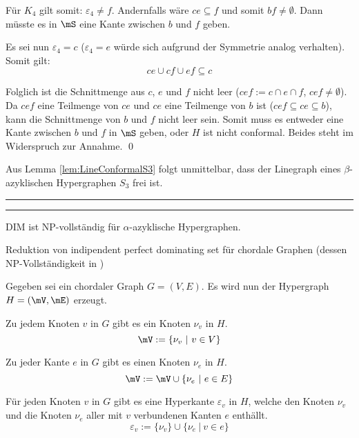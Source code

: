 \begin{Proof}
Für $K_4$ gilt somit: $\varepsilon_4\neq f$. Andernfalls wäre $ce \subseteq f$ und somit $bf\neq\emptyset$. Dann müsste es in $\mS$ eine Kante zwischen $b$ und $f$ geben. 

Es sei nun $\varepsilon_4=c$ ($\varepsilon_4=e$ würde sich aufgrund der Symmetrie analog verhalten). Somit gilt:
\[ce \cup cf \cup ef \subseteq c\]

Folglich ist die Schnittmenge aus $c$, $e$ und $f$ nicht leer ($cef:=c \cap e \cap f$, $cef \neq \emptyset$). Da $cef$ eine Teilmenge von $ce$ und $ce$ eine Teilmenge von $b$ ist ($cef \subseteq ce \subseteq b$), kann die Schnittmenge von $b$ und $f$ nicht leer sein.
Somit muss es entweder eine Kante zwischen $b$ und $f$ in $\mS$ geben, oder $H$ ist nicht conformal. Beides steht im Widerspruch zur Annahme.
\qed
\end{Proof}

Aus Lemma \ref{lem:LineConformalS3} folgt unmittelbar, dass der Linegraph eines $\beta$-azyklischen Hypergraphen $S_3$ frei ist.

\rule{\linewidth}{1pt}
\clearpage


\rule{\linewidth}{1pt}
\clearpage

\begin{Theorem}
	DIM ist NP-vollständig für $\alpha$-azyklische Hypergraphen.
\end{Theorem}
Reduktion von indipendent perfect dominating set für chordale Graphen (dessen NP-Vollständigkeit in \cite{ChainChin1996})

Gegeben sei ein chordaler Graph $G=(V,E)$. Es wird nun der Hypergraph $H=(\mV,\mE)$ erzeugt.

Zu jedem Knoten $v$ in $G$ gibt es ein Knoten $\nu_v$ in $H$. $$\mV := \{\nu_v\ |\ v \in V\}$$

Zu jeder Kante $e$ in $G$ gibt es einen Knoten $\nu_e$ in $H$. $$\mV := \mV \cup \{\nu_e\ |\ e \in E\}$$

Für jeden Knoten $v$ in $G$ gibt es eine Hyperkante $\varepsilon_v$ in $H$, welche den Knoten $\nu_v$ und die Knoten $\nu_e$ aller mit $v$ verbundenen Kanten $e$ enthällt. $$\varepsilon_v := \{\nu_v\} \cup \{\nu_e\ |\ v\in e\}$$

